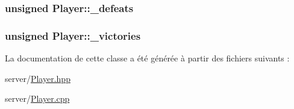 \subsubsection[{\+\_\+defeats}]{\setlength{\rightskip}{0pt plus 5cm}unsigned Player\+::\+\_\+defeats\hspace{0.3cm}{\ttfamily [protected]}}\label{classPlayer_aa3e1c71c5439841e5f3728c2a567344e}
\hypertarget{classPlayer_aa9529e5da5724425ef1e94fb3f5b791f}{}
\subsubsection[{\+\_\+victories}]{\setlength{\rightskip}{0pt plus 5cm}unsigned Player\+::\+\_\+victories\hspace{0.3cm}{\ttfamily [protected]}}\label{classPlayer_aa9529e5da5724425ef1e94fb3f5b791f}


La documentation de cette classe a été générée à partir des fichiers suivants \+:\begin{DoxyCompactItemize}
\item 
server/\hyperlink{Player_8hpp}{Player.\+hpp}\item 
server/\hyperlink{Player_8cpp}{Player.\+cpp}\end{DoxyCompactItemize}
